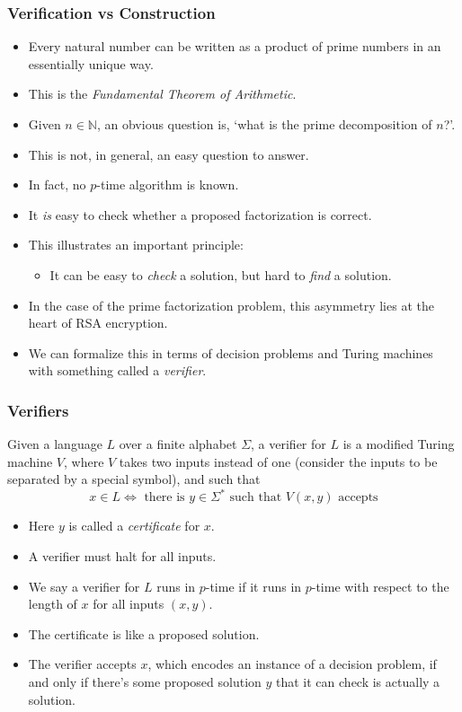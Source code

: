 \documentclass[handout]{beamer}
\newcommand{\bN}{\mathbb{N}}
\begin{document}
\begin{frame}
\frametitle{Verification vs Construction}
\begin{itemize}
\item Every natural number can be written as a product of prime numbers in an essentially unique way. 
\item This is the \emph{Fundamental Theorem of Arithmetic}. 
\item Given $n\in\bN$, an obvious question is, `what is the prime decomposition of $n$?'. 
\item This is not, in general, an easy question to answer. 
\item In fact, no $p$-time algorithm is known. 
\item It \emph{is} easy to check whether a proposed factorization is correct. 
\item This illustrates an important principle: 
\begin{itemize}
\item It can be easy to \emph{check} a solution, but hard to \emph{find} a solution.
\end{itemize}
\item In the case of the prime factorization problem, this asymmetry lies at the heart of RSA encryption.
\item We can formalize this in terms of decision problems and Turing machines with something called a \emph{verifier}.
\end{itemize} 
\end{frame}

\begin{frame}
\frametitle{Verifiers}
\begin{definition}[Verifier]
Given a language $L$ over a finite alphabet $\Sigma$, a verifier for $L$ is a modified Turing machine $V$, where $V$ takes two inputs instead of one (consider the inputs to be separated by a special symbol), and such that
\[x\in L\iff \text{ there is } y\in\Sigma^* \text{ such that } V(x,y) \text{ accepts}\] 
\end{definition}
\begin{itemize}
\item Here $y$ is called a \emph{certificate} for $x$. 
\item A verifier must halt for all inputs. 
\item We say a verifier for $L$ runs in $p$-time if it runs in $p$-time with respect to the length of $x$ for all inputs $(x,y)$. 
\item The certificate is like a proposed solution. 
\item The verifier accepts $x$, which encodes an instance of a decision problem, if and only if there's some proposed solution $y$ that it can check is actually a solution. 
\end{itemize}
\end{frame}
\end{document}
